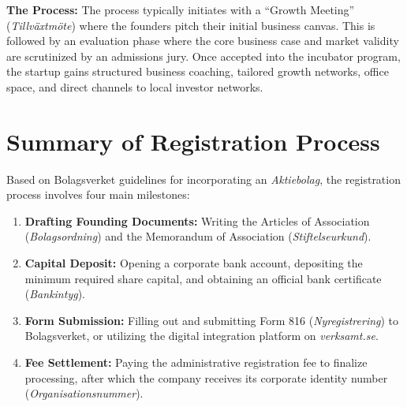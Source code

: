 \documentclass[12pt,a4paper]{article}
\begin{document}
\textbf{The Process:} The process typically initiates with a ``Growth Meeting'' (\textit{Tillväxtmöte}) where the founders pitch their initial business canvas. This is followed by an evaluation phase where the core business case and market validity are scrutinized by an admissions jury. Once accepted into the incubator program, the startup gains structured business coaching, tailored growth networks, office space, and direct channels to local investor networks.

\section{Summary of Registration Process}
Based on Bolagsverket guidelines for incorporating an \textit{Aktiebolag}, the registration process involves four main milestones:
\begin{enumerate}
    \item \textbf{Drafting Founding Documents:} Writing the Articles of Association (\textit{Bolagsordning}) and the Memorandum of Association (\textit{Stiftelseurkund}).
    \item \textbf{Capital Deposit:} Opening a corporate bank account, depositing the minimum required share capital, and obtaining an official bank certificate (\textit{Bankintyg}).
    \item \textbf{Form Submission:} Filling out and submitting Form 816 (\textit{Nyregistrering}) to Bolagsverket, or utilizing the digital integration platform on \textit{verksamt.se}.
    \item \textbf{Fee Settlement:} Paying the administrative registration fee to finalize processing, after which the company receives its corporate identity number (\textit{Organisationsnummer}).
\end{enumerate}
\end{document}
